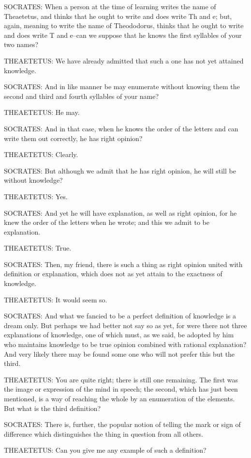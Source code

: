 SOCRATES: When a person at the time of learning writes the name of
Theaetetus, and thinks that he ought to write and does write Th and e;
but, again, meaning to write the name of Theododorus, thinks that he
ought to write and does write T and e--can we suppose that he knows the
first syllables of your two names?

THEAETETUS: We have already admitted that such a one has not yet
attained knowledge.

SOCRATES: And in like manner be may enumerate without knowing them the
second and third and fourth syllables of your name?

THEAETETUS: He may.

SOCRATES: And in that case, when he knows the order of the letters and
can write them out correctly, he has right opinion?

THEAETETUS: Clearly.

SOCRATES: But although we admit that he has right opinion, he will still
be without knowledge?

THEAETETUS: Yes.

SOCRATES: And yet he will have explanation, as well as right opinion,
for he knew the order of the letters when he wrote; and this we admit to
be explanation.

THEAETETUS: True.

SOCRATES: Then, my friend, there is such a thing as right opinion united
with definition or explanation, which does not as yet attain to the
exactness of knowledge.

THEAETETUS: It would seem so.

SOCRATES: And what we fancied to be a perfect definition of knowledge
is a dream only. But perhaps we had better not say so as yet, for were
there not three explanations of knowledge, one of which must, as we
said, be adopted by him who maintains knowledge to be true opinion
combined with rational explanation? And very likely there may be found
some one who will not prefer this but the third.

THEAETETUS: You are quite right; there is still one remaining. The first
was the image or expression of the mind in speech; the second, which has
just been mentioned, is a way of reaching the whole by an enumeration of
the elements. But what is the third definition?

SOCRATES: There is, further, the popular notion of telling the mark or
sign of difference which distinguishes the thing in question from all
others.

THEAETETUS: Can you give me any example of such a definition?

